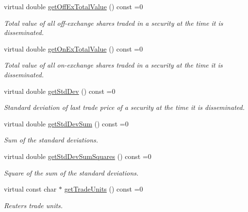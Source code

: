 \begin{CompactItemize}
virtual double \hyperlink{classWombat_1_1MamdaTradeRecap_96ea4f22af059b55175f2fa99696ea80}{get\-Off\-Ex\-Total\-Value} () const =0
\begin{CompactList}\small\item\em Total value of all off-exchange shares traded in a security at the time it is disseminated. \item\end{CompactList}\item 
virtual double \hyperlink{classWombat_1_1MamdaTradeRecap_3e76017039351d288886d5f467d9364c}{get\-On\-Ex\-Total\-Value} () const =0
\begin{CompactList}\small\item\em Total value of all on-exchange shares traded in a security at the time it is disseminated. \item\end{CompactList}\item 
virtual double \hyperlink{classWombat_1_1MamdaTradeRecap_388ccb8e0d7bbc9be4c2fbdbef376aa8}{get\-Std\-Dev} () const =0
\begin{CompactList}\small\item\em Standard deviation of last trade price of a security at the time it is disseminated. \item\end{CompactList}\item 
virtual double \hyperlink{classWombat_1_1MamdaTradeRecap_65b971acc07bbbc6f593b7e7a803e6c4}{get\-Std\-Dev\-Sum} () const =0
\begin{CompactList}\small\item\em Sum of the standard deviations. \item\end{CompactList}\item 
virtual double \hyperlink{classWombat_1_1MamdaTradeRecap_a2fb46ed6a57f14eb2a25ddbca0d902a}{get\-Std\-Dev\-Sum\-Squares} () const =0
\begin{CompactList}\small\item\em Square of the sum of the standard deviations. \item\end{CompactList}\item 
virtual const char $\ast$ \hyperlink{classWombat_1_1MamdaTradeRecap_f1d081fdecd01cd5e59210ff4be63d16}{get\-Trade\-Units} () const =0
\begin{CompactList}\small\item\em Reuters trade units. \item\end{CompactList}\item 

\end{CompactItemize}

